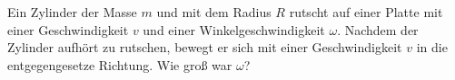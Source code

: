 \begin{minipage}[b]{0.65\textwidth}
\begin{Exercise}[title = rutschender Zylinder, origin = EstPho 2016, difficulty = 3, label = cylinder]
 Ein Zylinder der Masse $m$ und mit dem Radius $R$ rutscht auf einer Platte mit einer Geschwindigkeit $v$ und einer Winkelgeschwindigkeit $\omega$. Nachdem der Zylinder aufhört zu rutschen, bewegt er sich mit einer Geschwindigkeit $v$ in die entgegengesetze Richtung. Wie groß war $\omega$?
\end{Exercise}
\end{minipage}
\begin{minipage}[t]{0.35\textwidth}
	\centering
\end{minipage}
